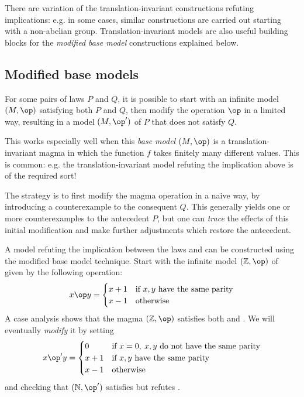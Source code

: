 There are variation of the translation-invariant constructions refuting implications: e.g. in some cases,
similar constructions are carried out starting with a non-abelian group. Translation-invariant models
are also useful building blocks for the \emph{modified base model} constructions explained below.

\subsection{Modified base models}

For some pairs of laws $P$ and $Q$, it is possible to start with an infinite model $(M,\op)$ satisfying both $P$ and $Q$,
then modify the operation $\op$ in a limited way, resulting in a model $(M,\op')$ of $P$ that does not satisfy $Q$.

This works especially well when this \emph{base model} $(M,\op)$ is a translation-invariant magma in which
the function $f$ takes finitely many different values. This is common: e.g. the translation-invariant model
refuting the implication above is of the required sort!

The strategy is to first modify the magma operation in a naive way, by introducing a counterexample to the
consequent $Q$. This generally yields one or more counterexamples to the antecedent $P$, but one can
\emph{trace} the effects of this initial modification and make further adjustments which restore the
antecedent.

A model refuting the implication between the laws  and  can be constructed using
the modified base model technique. Start with the infinite model $(\mathbb{Z},\op)$ of  given by the following operation:
$$ x\op y = \begin{cases} x+1 & \text{if } x,y \text{ have the same parity} \\ x -1 & \text{otherwise} \end{cases} $$
A case analysis shows that the magma $(\mathbb{Z},\op)$  satisfies both  and .
We will eventually \emph{modify} it by setting
$$x \op' y = \begin{cases} 0 & \text{if } x=0,\: x,y \text{ do not have the same parity} \\  x+1 & \text{if } x,y \text{ have the same parity} \\ x -1 & \text{otherwise} \end{cases}$$
and checking that $(\mathbb{N}, \op' )$ satisfies  but refutes .


